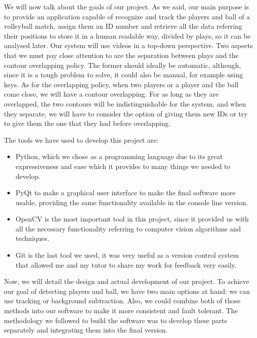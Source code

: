 We will now talk about the goals of our project. As we said, our main purpose is to provide an application capable of recognize and track the players and ball of a volleyball match, assign them an ID number and retrieve all the data referring their positions to store it in a human readable way, divided by plays, so it can be analysed later. Our system will use videos in a top-down perspective. Two aspects that we must pay close attention to are the separation between plays and the contour overlapping policy. The former should ideally be automatic, although, since it is a tough problem to solve, it could also be manual, for example using keys. As for the overlapping policy, when two players or a player and the ball come close, we will have a contour overlapping. For as long as they are overlapped, the two contours will be indistinguishable for the system, and when they separate, we will have to consider the option of giving them new IDs or try to give them the one that they had before overlapping. 

The tools we have used to develop this project are: 
\begin{itemize}
    \item Python, which we chose as a programming language due to its great expressiveness and ease which it provides to many things we needed to develop.
    \item PyQt to make a graphical user interface to make the final software more usable, providing the same functionality available in the console line version.
    \item OpenCV is the most important tool in this project, since it provided us with all the necessary functionality referring to computer vision algorithms and techniques.  
    \item Git is the last tool we used, it was very useful as a version control system that allowed me and my tutor to share my work for feedback very easily.
\end{itemize}

Now, we will detail the design and actual development of our project. To achieve our goal of detecting players and ball, we have two main options at hand: we can use tracking or background subtraction. Also, we could combine both of those methods into our software to make it more consistent and fault tolerant. The methodology we followed to build the software was to develop these parts separately and integrating them into the final version.

